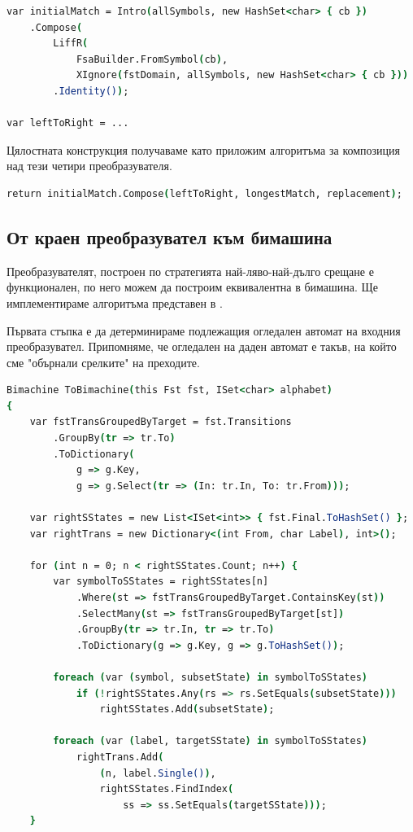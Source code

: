 \documentclass[12pt, oneside]{article}
\theoremstyle{definition}
\begin{document}
\begin{lstlisting}[language=csh,firstnumber=1]
var initialMatch = Intro(allSymbols, new HashSet<char> { cb })
    .Compose(
        LiffR(
            FsaBuilder.FromSymbol(cb),
            XIgnore(fstDomain, allSymbols, new HashSet<char> { cb }))
        .Identity());

var leftToRight = ...
\end{lstlisting}

Цялостната конструкция получаваме като приложим алгоритъма за композиция над тези четири преобразувателя.

\begin{lstlisting}[language=csh,firstnumber=9]
	return initialMatch.Compose(leftToRight, longestMatch, replacement);
\end{lstlisting}

\subsection{От краен преобразувател към бимашина}

Преобразувателят, построен по стратегията най-ляво-най-дълго срещане е функционален, по него можем да построим еквивалентна в бимашина. Ще имплементираме алгоритъма представен в \cite{GerdjikovEtAl:2017}.

Първата стъпка е да детерминираме подлежащия огледален автомат на входния преобразувател. Припомняме, че огледален на даден автомат е такъв, на който сме "обърнали срелките" на преходите.

\begin{lstlisting}[language=csh,firstnumber=1]
Bimachine ToBimachine(this Fst fst, ISet<char> alphabet)
{
    var fstTransGroupedByTarget = fst.Transitions
        .GroupBy(tr => tr.To)
        .ToDictionary(
            g => g.Key, 
            g => g.Select(tr => (In: tr.In, To: tr.From)));

    var rightSStates = new List<ISet<int>> { fst.Final.ToHashSet() };
    var rightTrans = new Dictionary<(int From, char Label), int>();

    for (int n = 0; n < rightSStates.Count; n++) {
        var symbolToSStates = rightSStates[n]
            .Where(st => fstTransGroupedByTarget.ContainsKey(st))
            .SelectMany(st => fstTransGroupedByTarget[st])
            .GroupBy(tr => tr.In, tr => tr.To)
            .ToDictionary(g => g.Key, g => g.ToHashSet());

        foreach (var (symbol, subsetState) in symbolToSStates)
            if (!rightSStates.Any(rs => rs.SetEquals(subsetState)))
                rightSStates.Add(subsetState);
        
        foreach (var (label, targetSState) in symbolToSStates)
            rightTrans.Add(
                (n, label.Single()),
                rightSStates.FindIndex(
                    ss => ss.SetEquals(targetSState)));
	}
\end{lstlisting}
\end{document}
